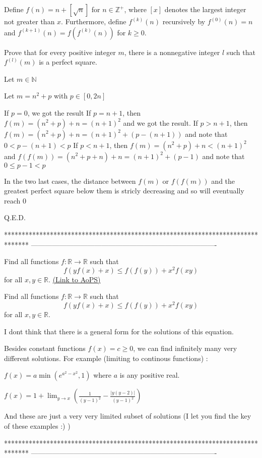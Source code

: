 \begin{solution}
	\begin{tcolorbox}Define $f(n)=n+[\sqrt{n}]$ for $n\in\mathbb{Z}^+$, where $[x]$ denotes the largest integer not greater than $x$.
Furthermore, define $f^{(k)}(n)$ recursively by $f^{(0)}(n)=n$ and $f^{(k+1)}(n)=f\left(f^{(k)}(n)\right)$ for $k\ge 0$.

Prove that for every positive integer $m$, there is a nonnegative integer $l$ such that $f^{(l)}(m)$ is a perfect square.\end{tcolorbox}
Let $m\in\mathbb N$ 

Let $m=n^2+p$ with $p\in[0,2n]$

If $p=0$, we got the result
If $p=n+1$, then $f(m)=(n^2+p)+n=(n+1)^2$ and we got the result.
If $p>n+1$, then $f(m)=(n^2+p)+n=(n+1)^2+(p-(n+1))$ and note that $0<p-(n+1)<p$
If $p<n+1$, then $f(m)=(n^2+p)+n<(n+1)^2$ and $f(f(m))=(n^2+p+n)+n=(n+1)^2+(p-1)$ and note that $0\le p-1<p$

In the two last cases, the distance between $f(m)$ or $f(f(m))$ and the greatest perfect square below them is stricly decreasing and so will eventually reach $0$

Q.E.D.
\end{solution}
*******************************************************************************
-------------------------------------------------------------------------------

\begin{problem}
	Find all functions $f : \mathbb{R} \rightarrow \mathbb{R}$ such that
\[f(yf(x) + x) \le f(f(y)) + x^2f(xy)\]
for all $x,y \in \mathbb{R}$.
	\flushright \href{https://artofproblemsolving.com/community/c6h483681}{(Link to AoPS)}
\end{problem}



\begin{solution}
	\begin{tcolorbox}Find all functions $f : \mathbb{R} \rightarrow \mathbb{R}$ such that
\[f(yf(x) + x) \le f(f(y)) + x^2f(xy)\]
for all $x,y \in \mathbb{R}$.\end{tcolorbox}
I dont think that there is a general form for the solutions of this equation.

Besides constant functions $f(x)=c\ge 0$, we can find infinitely many very different solutions. For example (limiting to continous functions) :

$f(x)=a\min(e^{a^2-x^2},1)$ where $a$ is any positive real.

$f(x)=1+\lim_{y\to x}\left(\frac 1{(y-1)^2}-\frac{|y(y-2)|}{(y-1)^2}\right)$

And these are just a very very limited subset of solutions (I let you find the key of these examples :) )
\end{solution}
*******************************************************************************
-------------------------------------------------------------------------------

